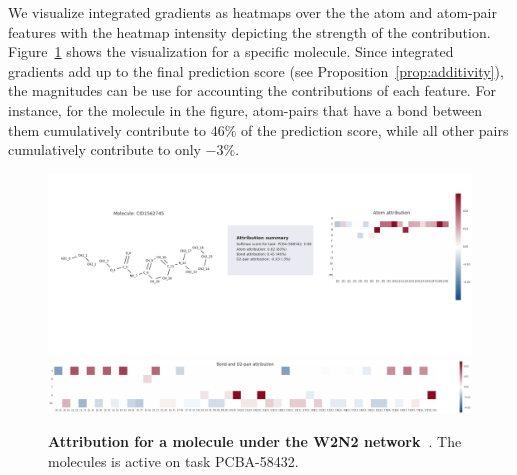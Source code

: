 
We visualize integrated gradients as heatmaps over the the atom and
atom-pair features with the heatmap intensity depicting the strength
of the contribution. Figure~\ref{fig:attribution-gas} shows the
visualization for a specific molecule. Since integrated gradients add
up to the final prediction score (see
Proposition~\ref{prop:additivity}), the magnitudes can be use for
accounting the contributions of each feature.  For instance, for the
molecule in the figure, atom-pairs that have a bond between them
cumulatively contribute to $46\%$ of the prediction score, while all
other pairs cumulatively contribute to only $-3\%$.


\begin{figure}[!ht]
  \centering
  \includegraphics[width=0.9\columnwidth]{./Figures/GAS/W2OneHot/attr-vis-atoms.png}
  \includegraphics[width=0.9\columnwidth]{./Figures/GAS/W2OneHot/attr-vis-pairs.png}
  \caption{\textbf{Attribution for a molecule under the W2N2 network~\cite{KMBPR16}}.
    The molecules is active on task PCBA-58432.}\label{fig:attribution-gas}
\end{figure}

